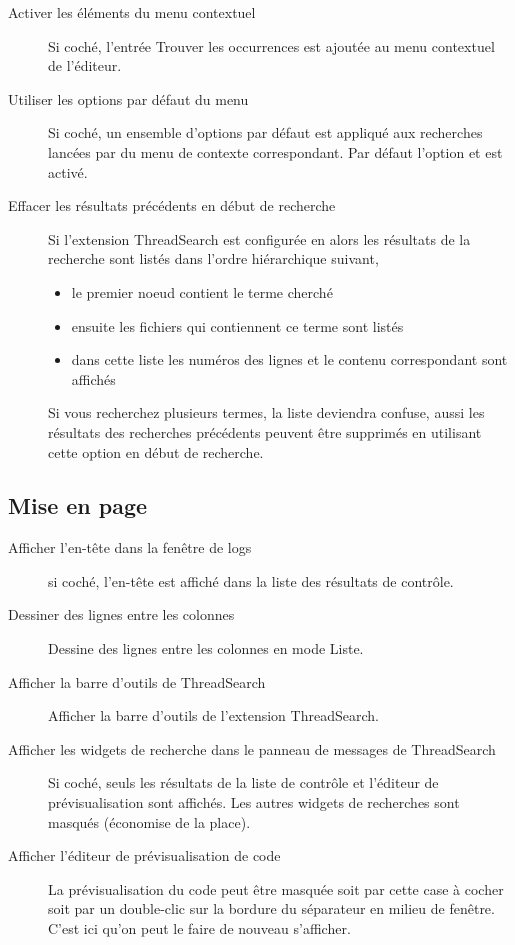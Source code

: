 \begin{description}
\item[Activer les éléments du menu contextuel ] Si coché, l'entrée Trouver les occurrences est ajoutée au menu contextuel de l'éditeur.
\item[Utiliser les options par défaut du menu ] Si coché, un ensemble d'options par défaut est appliqué aux recherches lancées par  du menu de contexte correspondant. Par défaut l'option  et  est activé.
\item[Effacer les résultats précédents en début de recherche] Si l'extension ThreadSearch est configurée en  alors les résultats de la recherche sont listés dans l'ordre hiérarchique suivant,
\begin{itemize}
\item le premier noeud contient le terme cherché
\item ensuite les fichiers qui contiennent ce terme sont listés
\item dans cette liste les numéros des lignes et le contenu correspondant sont affichés
\end{itemize}
Si vous recherchez plusieurs termes, la liste deviendra confuse, aussi les résultats des recherches précédents peuvent être supprimés en utilisant cette option en début de recherche.
\end{description}

\subsection{Mise en page}

\begin{description}
\item[Afficher l'en-tête dans la fenêtre de logs] si coché, l'en-tête est affiché dans la liste des résultats de contrôle.
\item[Dessiner des lignes entre les colonnes] Dessine des lignes entre les colonnes en mode Liste.
\item[Afficher la barre d'outils de ThreadSearch] Afficher la barre d'outils de l'extension ThreadSearch.
\item[Afficher les widgets de recherche dans le panneau de messages de ThreadSearch] Si coché, seuls les résultats de la liste de contrôle et l'éditeur de prévisualisation sont affichés. Les autres widgets de recherches sont masqués (économise de la place).
\item[Afficher l'éditeur de prévisualisation de code] La prévisualisation du code peut être masquée soit par cette case à cocher soit par un double-clic sur la bordure du séparateur en milieu de fenêtre. C'est ici qu'on peut le faire de nouveau s'afficher.
\end{description}

